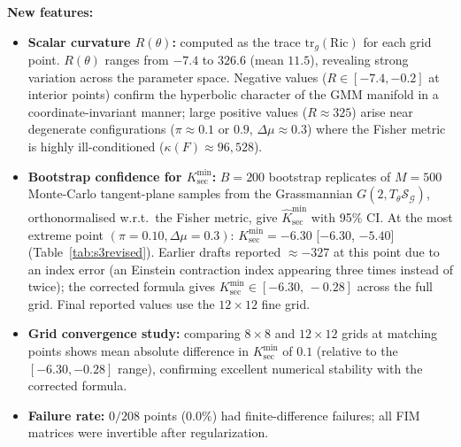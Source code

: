 \documentclass[a4paper,fleqn]{cas-dc}
\newcommand{\calS}{\mathcal{S}}
\newcommand{\calG}{\mathcal{G}}
\begin{document}
\textbf{New features:}
\begin{itemize}
  \item \textbf{Scalar curvature $R(\theta)$:} computed as the trace
        $\mathrm{tr}_g(\mathrm{Ric})$ for each grid point.
        $R(\theta)$ ranges from $-7.4$ to $326.6$ (mean $11.5$),
        revealing strong variation across the parameter space.
        Negative values ($R \in [-7.4, -0.2]$ at interior points)
        confirm the hyperbolic character of the GMM manifold in a
        coordinate-invariant manner; large positive values ($R \approx 325$)
        arise near degenerate configurations ($\pi \approx 0.1$ or $0.9$,
        $\Delta\mu \approx 0.3$) where the Fisher metric is highly ill-conditioned
        ($\kappa(F) \approx 96{,}528$).
  \item \textbf{Bootstrap confidence for $K_{\sec}^{\min}$:}
        $B=200$ bootstrap replicates of $M=500$ Monte-Carlo tangent-plane samples
        from the Grassmannian $G(2, T_\theta\calS_{\calG})$, orthonormalised w.r.t.\
        the Fisher metric, give $\widehat{K}_{\sec}^{\min}$ with 95\% CI.
        At the most extreme point $(\pi=0.10, \Delta\mu=0.3)$:
        $K_{\sec}^{\min} = -6.30$ [$-6.30$, $-5.40$] (Table~\ref{tab:s3revised}).
        Earlier drafts reported $\approx -327$ at this point due to an index
        error (an Einstein contraction index appearing three times instead of
        twice); the corrected formula gives $K_{\sec}^{\min}\in[-6.30,\,-0.28]$
        across the full grid.
        Final reported values use the $12\times12$ fine grid.
  \item \textbf{Grid convergence study:} comparing $8\times8$ and
        $12\times12$ grids at matching points shows mean absolute difference in
        $K_{\sec}^{\min}$ of $0.1$ (relative to the $[-6.30, -0.28]$ range),
        confirming excellent numerical stability with the corrected formula.
  \item \textbf{Failure rate:} $0/208$ points ($0.0\%$) had finite-difference
        failures; all FIM matrices were invertible after regularization.
\end{itemize}
\end{document}
